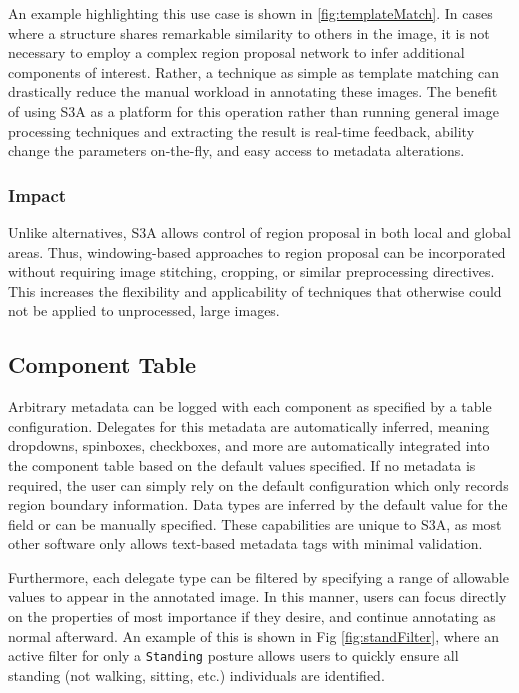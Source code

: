 An example highlighting this use case is shown in \autoref{fig:templateMatch}. In cases where a structure shares remarkable similarity to others in the image, it is not necessary to employ a complex region proposal network to infer additional components of interest. Rather, a technique as simple as template matching can drastically reduce the manual workload in annotating these images. The benefit of using S3A as a platform for this operation rather than running general image processing techniques and extracting the result is real-time feedback, ability change the parameters on-the-fly, and easy access to metadata alterations.

\makeTemplateMatchFig

\subsubsection{Impact}
Unlike alternatives, S3A allows control of region proposal in both local and global areas. Thus, windowing-based approaches to region proposal can be incorporated without requiring image stitching, cropping, or similar preprocessing directives. This increases the flexibility and applicability of techniques that otherwise could not be applied to unprocessed, large images.

\subsection{Component Table}

Arbitrary metadata can be logged with each component as specified by a table configuration. Delegates for this metadata are automatically inferred, meaning dropdowns, spinboxes, checkboxes, and more are automatically integrated into the component table based on the default values specified. If no metadata is required, the user can simply rely on the default configuration which only records region boundary information. Data types are inferred by the default value for the field or can be manually specified. These capabilities are unique to S3A, as most other software only allows text-based metadata tags with minimal validation.

Furthermore, each delegate type can be filtered by specifying a range of allowable values to appear in the annotated image. In this manner, users can focus directly on the properties of most importance if they desire, and continue annotating as normal afterward. An example of this is shown in Fig \ref{fig:standFilter}, where an active filter for only a \texttt{Standing} posture allows users to quickly ensure all standing (not walking, sitting, etc.) individuals are identified.

